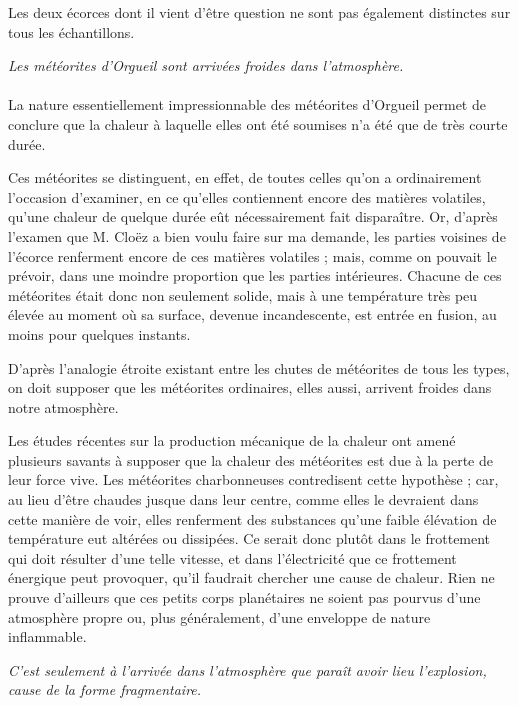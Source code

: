 \documentclass[a4paper, 11pt, oneside, polutonikogreek, french]{article}
\begin{document}
Les deux écorces dont il vient d'être question ne sont pas également distinctes sur tous les échantillons.
\begin{center}
\emph{Les météorites d'Orgueil sont arrivées froides dans l'atmosphère.}
\end{center}
\paragraph{}
La nature essentiellement impressionnable des météorites d'Orgueil permet de conclure que la chaleur à laquelle elles ont été soumises n'a été que de très courte durée.

Ces météorites se distinguent, en effet, de toutes celles qu'on a ordinairement l'occasion d'examiner, en ce qu'elles contiennent encore des matières volatiles, qu'une chaleur de quelque durée eût nécessairement fait disparaître. Or, d'après l'examen que M. Cloëz a bien voulu faire sur ma demande, les parties voisines de l'écorce renferment encore de ces matières volatiles ; mais, comme on pouvait le prévoir, dans une moindre proportion que les parties intérieures. Chacune de ces météorites était donc non seulement solide, mais à une température très peu élevée au moment où sa surface, devenue incandescente, est entrée en fusion, au moins pour quelques instants.

D'après l'analogie étroite existant entre les chutes de météorites de tous les types, on doit supposer que les météorites ordinaires, elles aussi, arrivent froides dans notre atmosphère.

Les études récentes sur la production mécanique de la chaleur ont amené plusieurs savants à supposer que la chaleur des météorites est due à la perte de leur force vive. Les météorites charbonneuses contredisent cette hypothèse ; car, au lieu d'être chaudes jusque dans leur centre, comme elles le devraient dans cette manière de voir, elles renferment des substances qu'une faible élévation de température eut altérées ou dissipées. Ce serait donc plutôt dans le frottement qui doit résulter d'une telle vitesse, et dans l'électricité que ce frottement énergique peut provoquer, qu'il faudrait chercher une cause de chaleur. Rien ne prouve d'ailleurs que ces petits corps planétaires ne soient pas pourvus d'une atmosphère propre ou, plus généralement, d'une enveloppe de nature inflammable.
\begin{center}
\emph{C'est seulement à l'arrivée dans l'atmosphère que paraît avoir lieu l'explosion, cause de la forme fragmentaire.}
\end{center}
\end{document}
